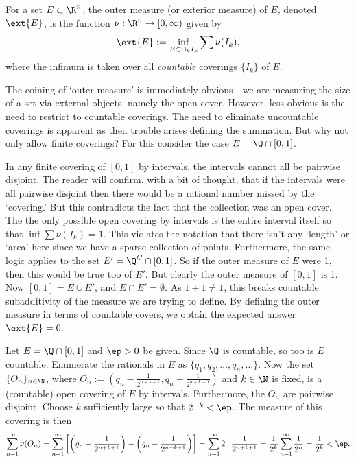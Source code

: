 \begin{dfn}
For a set $E \subset \R^n$, the outer measure (or exterior measure) of $E$, denoted $\ext{E}$, is the function $\nu: \R^n \to [0,\infty)$ given by
	\[
	\ext{E}:= \inf_{E \subset \cup_k I_k} \sum \nu(I_k),
	\]
where the infimum is taken over all \emph{countable} coverings $\{I_k\}$ of $E$. 
\end{dfn}

The coining of `outer measure' is immediately obvious---we are measuring the size of a set via external objects, namely the open cover. However, less obvious is the need to restrict to countable coverings. The need to eliminate uncountable coverings is apparent as then trouble arises defining the summation. But why not only allow finite coverings? For this consider the case $E= \Q \cap [0,1]$. 

In any finite covering of $[0,1]$ by intervals, the intervals cannot all be pairwise disjoint. The reader will confirm, with a bit of thought, that if the intervals were all pairwise disjoint then there would be a rational number missed by the `covering.' But this contradicts the fact that the collection was an open cover. The the only possible open covering by intervals is the entire interval itself so that $\inf \sum \nu(I_k)=1$. This violates the notation that there isn't any `length' or `area' here since we have a sparse collection of points. Furthermore, the same logic applies to the set $E'=\Q^C \cap [0,1]$. So if the outer measure of $E$ were 1, then this would be true too of $E'$. But clearly the outer measure of $[0,1]$ is 1. Now $[0,1]=E \cup E'$, and $E \cap E'=\emptyset$. As $1+1 \neq 1$, this breaks countable subadditivity of the measure we are trying to define. By defining the outer measure in terms of countable covers, we obtain the expected answer $\ext{E}=0$. 

\begin{ex}
Let $E=\Q \cap [0,1]$ and $\ep>0$ be given. Since $\Q$ is countable, so too is $E$ countable. Enumerate the rationals in $E$ as $\{q_1,q_2,\ldots,q_n,\ldots\}$. Now the set $\{O_n\}_{n \in \N}$, where $O_n:= (q_n- \frac{1}{2^{n+k+1}}, q_n+\frac{1}{2^{n+k+1}})$ and $k \in \N$ is fixed, is a (countable) open covering of $E$ by intervals. Furthermore, the $O_n$ are pairwise disjoint. Choose $k$ sufficiently large so that $2^{-k}<\ep$. The measure of this covering is then
	\[
	\sum_{n=1}^\infty \nu(O_n)= \sum_{n=1}^\infty \left[ \left(q_n+\frac{1}{2^{n+k+1}}\right) - \left(q_n- \frac{1}{2^{n+k+1}}\right) \right]= \sum_{n=1}^\infty 2 \cdot \dfrac{1}{2^{n+k+1}}= \dfrac{1}{2^k} \sum_{n=1}^\infty \dfrac{1}{2^n}= \dfrac{1}{2^k}<\ep.
	\] \xqed
\end{ex}

